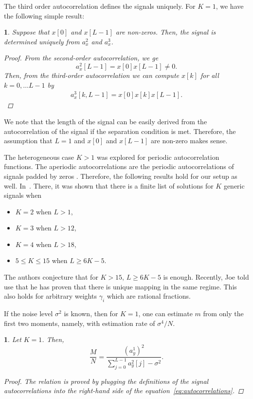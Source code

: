 \documentclass[english]{article}
\newcommand{\TODO}[1]{{\color{red}{[#1]}}}
\numberwithin{equation}{section}
\theoremstyle{plain}
\theoremstyle{definition}
\theoremstyle{remark}
\theoremstyle{plain}
\theoremstyle{remark}
\theoremstyle{plain}
\theoremstyle{plain}
\newtheorem{proposition}[thm]{\protect\propositionname}
\providecommand{\propositionname}{Proposition}
\begin{document}
The third order autocorrelation defines the signals uniquely. For $K=1$, we have the following simple result:
\begin{proposition}
	Suppose that $x[0]$ and $x[L-1]$ are non-zeros. Then, the signal is determined uniquely from  $a_x^2$ and $a_x^3$.
	\begin{proof}
From the second-order autocorrelation, we ge
\begin{equation*}
a_x^2[L-1] = x[0]x[L-1]\neq 0.
\end{equation*}
Then, from the third-order autocorrelation we can compute $x[k]$ for all $k=0,\ldots L-1$ by
\begin{eqnarray}
a_x^3[k,L-1] = x[0]x[k]x[L-1].
\end{eqnarray}
	\end{proof}
\end{proposition}
 We note that the length of the signal can be easily derived from the autocorrelation of the signal if the separation condition is met. Therefore, the assumption that $L=1$ and $x[0]$ and $x[L-1]$ are non-zero makes sense.

The heterogeneous case $K>1$ was explored for periodic autocorrelation functions. The aperiodic autocorrelations are the periodic autocorrelations of signals padded by zeros \TODO{we should be prudent here}. Therefore, the following results hold for our setup as well. In~\cite{bandeira2017estimation}. There, it was shown that 
there is a finite list of solutions for $K$ generic signals when 
\begin{itemize}
	\item $K=2$ when $L>1$,
	\item $K=3$ when $L>12$,
	\item $K=4$ when $L>18$,
	\item $5\leq K\leq 15$ when $L\geq 6K-5$.	
\end{itemize}
The authors conjecture that for $K>15$, $L\geq 6K-5$ is enough. Recently, Joe told use that he has proven that there is unique mapping in the same regime.  
This also holds for arbitrary weights $\gamma_i$ which are rational fractions.

If the noise level $\sigma^2$ is known, then for $K=1$, one can estimate $m$ from only the first two moments, namely, with estimation rate of $\sigma^4/N$.
\begin{proposition}
	Let $K=1$. Then, 
	\begin{equation*}
	\frac{M}{N} = \frac{(a^1_y)^2}{\sum_{j=0}^{L-1}a_y^2[j]-\sigma^2}.
	\end{equation*}
	\begin{proof}
The relation is proved by plugging the definitions of the signal autocorrelations into the right-hand side of the equation~\eqref{eq:autocorrelations}. 	
\end{proof}
\end{proposition}
\end{document}
